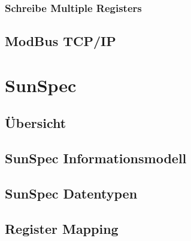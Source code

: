 \subsubsection{Schreibe Multiple Registers}
\label{sec:SchreibeMultipleRegister}

\subsection{ModBus TCP/IP}



\section{SunSpec}

\subsection{Übersicht}


\subsection{SunSpec Informationsmodell}
\label{sec:SunsSpecInformationsmodell}


\subsection{SunSpec Datentypen}


\subsection{Register Mapping}

